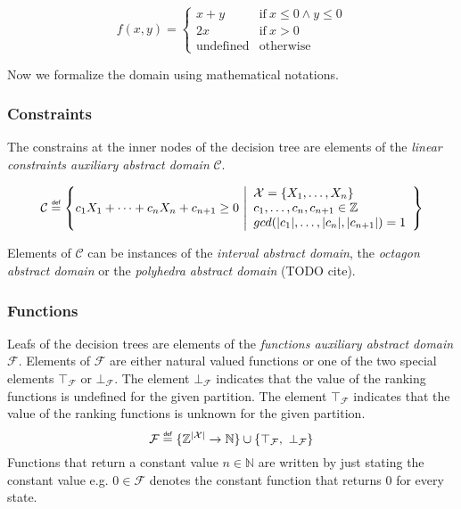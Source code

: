 \documentclass[11pt,a4paper,titlepage]{article}
\theoremstyle{definition}
\newcommand\eqdef{\mathrel{\overset{\makebox[0pt]{\mbox{\normalfont\tiny\sffamily def}}}{=}}}
\begin{document}
\[
    f(x, y) = \begin{cases}
            x+y                   & \text{if} \ x \leq 0 \land y \leq 0 \\
            2x                   & \text{if} \ x > 0 \\
            \text{undefined}    & \text{otherwise}
        \end{cases}
\]

Now we formalize the domain using mathematical notations.

\subsubsection*{Constraints}

The constrains at the inner nodes of the decision tree are elements of the 
\textit{linear constraints auxiliary abstract domain} $\mathcal{C}$.  

\[
    \mathcal{C} \eqdef 
    \left
        \{ 
        c_1 X_1 + \dots + c_n X_n + c_{n+1} \geq 0 \
        \middle\vert 
        \begin{array}{l}
            \mathcal{X} = \{X_1, \dots, X_n\}\\
            c_1, \dots, c_n, c_{n+1} \in \mathbb{Z} \\
            gcd(|c_1|, \dots, |c_n|, |c_{n+1}|) = 1
        \end{array}
    \right
    \}
\]

Elements of $\mathcal{C}$ can be instances of the \textit{interval abstract domain}, 
the \textit{octagon abstract domain} or the \textit{polyhedra abstract domain} (TODO cite).\\


\subsubsection*{Functions}

Leafs of the decision trees are elements of the \textit{functions auxiliary abstract domain} $\mathcal{F}$.
Elements of $\mathcal{F}$ are either natural valued functions or one of the two special elements $\top_{\mathcal{F}}$ or $\bot_{\mathcal{F}}$.
The element $\bot_{\mathcal{F}}$ indicates that the value of the ranking functions is undefined for the given partition. 
The element $\top_{\mathcal{F}}$ indicates that the value of the ranking functions is unknown for the given partition.
\[
    \mathcal{F} \eqdef \{ \mathbb{Z}^{|\mathcal{X}|} \rightarrow \mathbb{N} \} \cup \{ \top_{\mathcal{F}}, \ \bot_{\mathcal{F}} \}
\]
Functions that return a constant value $n \in \mathbb{N}$ are written by just stating the constant value e.g. $0 \in \mathcal{F}$ 
denotes the constant function that returns $0$ for every state.\\
\end{document}
